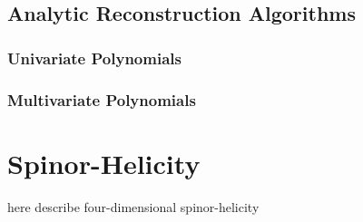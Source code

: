 \section{Analytic Reconstruction Algorithms}
\subsection{Univariate Polynomials}
\subsection{Multivariate Polynomials}




\chapter{Spinor-Helicity}
\label{chap:4dspinhel}

here describe four-dimensional spinor-helicity

